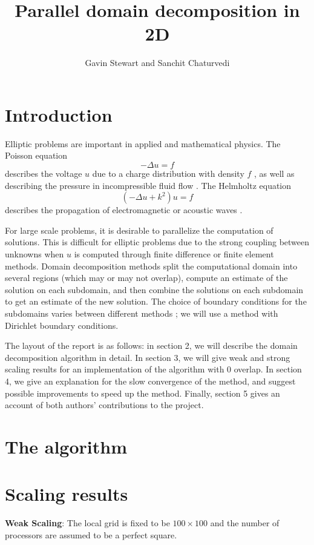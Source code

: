 \documentclass{article}
\title{Parallel domain decomposition in 2D}
\author{Gavin Stewart and Sanchit Chaturvedi}
\begin{document}
	\maketitle
	
	\section{Introduction}
	 
	Elliptic problems are important in applied and mathematical physics.  The Poisson equation 
	\begin{equation}
		-\Delta u = f
	\end{equation} describes the voltage \(u\) due to a charge distribution with density \(f\)%
	, as well as describing the pressure in incompressible fluid flow \cite{Marshall97}. The Helmholtz equation
	\begin{equation}
		(-\Delta u + k^2)u = f
	\end{equation} 
	describes the propagation of electromagnetic or acoustic waves \cite{Fairweather03}.
	
	For large scale problems, it is desirable to parallelize the computation of solutions.  This is difficult for elliptic problems due to the strong coupling between unknowns when \(u\) is computed through finite difference or finite element methods.  Domain decomposition methods split the computational domain into several regions (which may or may not overlap), compute an estimate of the solution on each  subdomain, and then combine the solutions on each subdomain to get an estimate of the new solution.  The choice of boundary conditions for the subdomains varies between different methods%
	; we will use a method with Dirichlet boundary conditions.
	
	The layout of the report is as follows: in section 2, we will describe the domain decomposition algorithm in detail.  In section 3, we will give weak and strong scaling results for an implementation of the algorithm with \(0\) overlap.  In section 4, we give an explanation for the slow convergence of the method, and suggest possible improvements to speed up the method.  Finally, section 5 gives an account of both authors' contributions to the project.
	
	\section{The algorithm}
	
	\section{Scaling results}
	\textbf{Weak Scaling}: The local grid is fixed to be $100\times100$ and the number of processors are assumed to be a perfect square. 
	
\end{document}
